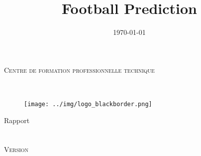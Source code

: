 \documentclass[a4paper,14pt]{extarticle}
\title{Football Prediction}
\author{\vhListAllAuthorsLongWithAbbrev}
\date{\today}
\begin{document}
  \begin{titlepage}
  \centering
      {\large \textsc{Centre de formation professionnelle technique}}\\
    \vspace{2cm}
    
    \vfill
       {\LARGE \textbf{\@title}} \\
    \vspace{1cm}
    \begin{figure}[H]
        \centering
        \texttt{[image: ../img/logo\_blackborder.png]}
    \end{figure}
    \vspace{1cm}
        { \LARGE Rapport}\\
    \vspace{2em}
        {\large \textbf{\@author}} \\
    \vspace{6em}
        {\large \@date}\\
    \vspace{1cm}
        {\large \textsc{Version \vhCurrentVersion}} \\
    \vfill
  \end{titlepage}
\makeatother

\newpage

\tableofcontents
\end{document}
